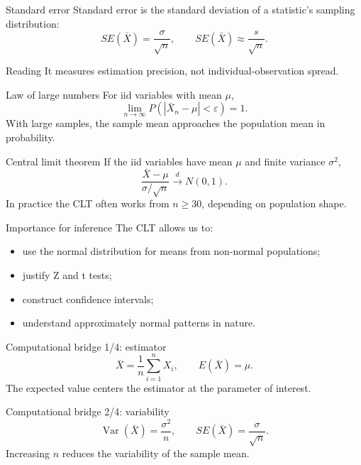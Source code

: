 \documentclass[10pt,aspectratio=169]{beamer}
\begin{document}
\begin{frame}{Standard error}
  \footnotesize
  Standard error is the standard deviation of a statistic's sampling
  distribution:
  \[
    SE(\bar X)=\frac{\sigma}{\sqrt n},
    \qquad SE(\bar X)\approx\frac{s}{\sqrt n}.
  \]
  \begin{alertblock}{Reading}
    It measures estimation precision, not individual-observation spread.
  \end{alertblock}
\end{frame}

\begin{frame}{Law of large numbers}
  \footnotesize
  For iid variables with mean $\mu$,
  \[
    \lim_{n\to\infty}P(|\bar X_n-\mu|<\varepsilon)=1.
  \]
  With large samples, the sample mean approaches the population mean in
  probability.
\end{frame}

\begin{frame}{Central limit theorem}
  \footnotesize
  If the iid variables have mean $\mu$ and finite variance $\sigma^2$,
  \[
    \frac{\bar X-\mu}{\sigma/\sqrt n}\xrightarrow{d}N(0,1).
  \]
  In practice the CLT often works from $n\ge30$, depending on population shape.
\end{frame}

\begin{frame}{Importance for inference}
  \footnotesize
  The CLT allows us to:
  \begin{itemize}\itemsep=0.1cm
    \item use the normal distribution for means from non-normal populations;
    \item justify Z and t tests;
    \item construct confidence intervals;
    \item understand approximately normal patterns in nature.
  \end{itemize}
\end{frame}

\begin{frame}{Computational bridge 1/4: estimator}
  \footnotesize
  \[
    \bar X=\frac1n\sum_{i=1}^nX_i,
    \qquad E(\bar X)=\mu.
  \]
  The expected value centers the estimator at the parameter of interest.
\end{frame}

\begin{frame}{Computational bridge 2/4: variability}
  \footnotesize
  \[
    \operatorname{Var}(\bar X)=\frac{\sigma^2}{n},
    \qquad SE(\bar X)=\frac{\sigma}{\sqrt n}.
  \]
  Increasing $n$ reduces the variability of the sample mean.
\end{frame}
\end{document}
